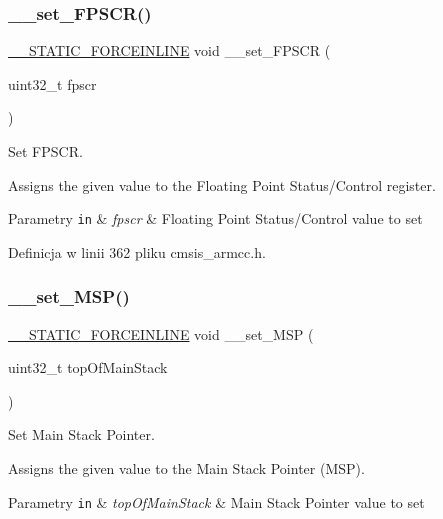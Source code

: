 \subsubsection{\texorpdfstring{\+\_\+\+\_\+set\+\_\+\+F\+P\+S\+C\+R()}{\_\_set\_FPSCR()}}
{\footnotesize\ttfamily \hyperlink{cmsis__iccarm_8h_ab904513442afdf77d4f8c74f23cbb040}{\+\_\+\+\_\+\+S\+T\+A\+T\+I\+C\+\_\+\+F\+O\+R\+C\+E\+I\+N\+L\+I\+NE} void \+\_\+\+\_\+set\+\_\+\+F\+P\+S\+CR (\begin{DoxyParamCaption}\item[{uint32\+\_\+t}]{fpscr }\end{DoxyParamCaption})}



Set F\+P\+S\+CR. 

Assigns the given value to the Floating Point Status/\+Control register. 
\begin{DoxyParams}[1]{Parametry}
\mbox{\tt in}  & {\em fpscr} & Floating Point Status/\+Control value to set \\
\hline
\end{DoxyParams}


Definicja w linii 362 pliku cmsis\+\_\+armcc.\+h.

\mbox{\label{group___c_m_s_i_s___core___reg_acc_functions_ga08b66e2b60a46fada36d90d2bc1e7c9b}} 
\subsubsection{\texorpdfstring{\+\_\+\+\_\+set\+\_\+\+M\+S\+P()}{\_\_set\_MSP()}}
{\footnotesize\ttfamily \hyperlink{cmsis__iccarm_8h_ab904513442afdf77d4f8c74f23cbb040}{\+\_\+\+\_\+\+S\+T\+A\+T\+I\+C\+\_\+\+F\+O\+R\+C\+E\+I\+N\+L\+I\+NE} void \+\_\+\+\_\+set\+\_\+\+M\+SP (\begin{DoxyParamCaption}\item[{uint32\+\_\+t}]{top\+Of\+Main\+Stack }\end{DoxyParamCaption})}



Set Main Stack Pointer. 

Assigns the given value to the Main Stack Pointer (M\+SP). 
\begin{DoxyParams}[1]{Parametry}
\mbox{\tt in}  & {\em top\+Of\+Main\+Stack} & Main Stack Pointer value to set \\
\hline
\end{DoxyParams}


